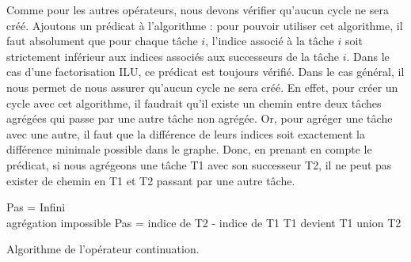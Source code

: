 Comme pour les autres opérateurs, nous devons vérifier qu'aucun cycle ne sera créé.
%
Ajoutons un prédicat à l'algorithme : pour pouvoir utiliser cet algorithme, il faut absolument que pour chaque tâche $i$, l'indice associé à la tâche $i$ soit strictement inférieur aux indices associés aux successeurs de la tâche $i$.
%
Dans le cas d'une factorisation ILU, ce prédicat est toujours vérifié.
%
Dans le cas général, il nous permet de nous assurer qu'aucun cycle ne sera créé.
%
En effet, pour créer un cycle avec cet algorithme, il faudrait qu'il existe un chemin entre deux tâches agrégées qui passe par une autre tâche non agrégée.
%
Or, pour agréger une tâche avec une autre, il faut que la différence de leurs indices soit exactement la différence minimale possible dans le graphe.
%
Donc, en prenant en compte le prédicat, si nous agrégeons une tâche T1 avec son successeur T2, il ne peut pas exister de chemin en T1 et T2 passant par une autre tâche.

\begin{algorithm}
  {\sc Pas} = Infini \\
   {
     {
       {
        \Return agrégation impossible
      }
       {
        {\sc Pas} = indice de {\sc T2} - indice de {\sc T1}
      }
    }
  }
   {
     {
       {
        {\sc T1} devient {\sc T1} union {\sc T2}
      }
    }
  }
  \caption{Algorithme de l'opérateur continuation.}
  \label{algo:algo_C}
\end{algorithm}
